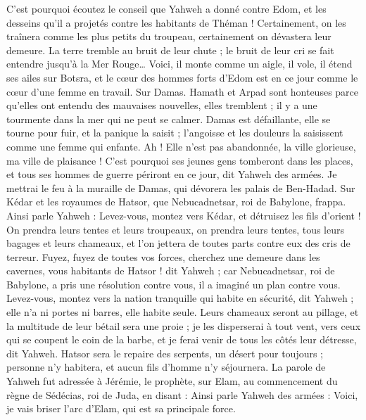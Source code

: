\begin{multicols}{2}
C'est pourquoi écoutez le conseil que Yahweh a donné contre Edom, et les desseins qu'il a projetés contre les habitants de Théman ! Certainement, on les traînera comme les plus petits du troupeau, certainement on dévastera leur demeure.
La terre tremble au bruit de leur chute ; le bruit de leur cri se fait entendre jusqu'à la Mer Rouge…
Voici, il monte comme un aigle, il vole, il étend ses ailes sur Botsra, et le cœur des hommes forts d'Edom est en ce jour comme le cœur d'une femme en travail.
Sur Damas. Hamath et Arpad sont honteuses parce qu'elles ont entendu des mauvaises nouvelles, elles tremblent ; il y a une tourmente dans la mer qui ne peut se calmer.
Damas est défaillante, elle se tourne pour fuir, et la panique la saisit ; l'angoisse et les douleurs la saisissent comme une femme qui enfante.
Ah ! Elle n'est pas abandonnée, la ville glorieuse, ma ville de plaisance !
C'est pourquoi ses jeunes gens tomberont dans les places, et tous ses hommes de guerre périront en ce jour, dit Yahweh des armées.
Je mettrai le feu à la muraille de Damas, qui dévorera les palais de Ben-Hadad.
Sur Kédar et les royaumes de Hatsor, que Nebucadnetsar, roi de Babylone, frappa. Ainsi parle Yahweh : Levez-vous, montez vers Kédar, et détruisez les fils d'orient !
On prendra leurs tentes et leurs troupeaux, on prendra leurs tentes, tous leurs bagages et leurs chameaux, et l'on jettera de toutes parts contre eux des cris de terreur.
Fuyez, fuyez de toutes vos forces, cherchez une demeure dans les cavernes, vous habitants de Hatsor ! dit Yahweh ; car Nebucadnetsar, roi de Babylone, a pris une résolution contre vous, il a imaginé un plan contre vous.
Levez-vous, montez vers la nation tranquille qui habite en sécurité, dit Yahweh ; elle n'a ni portes ni barres, elle habite seule.
Leurs chameaux seront au pillage, et la multitude de leur bétail sera une proie ; je les disperserai à tout vent, vers ceux qui se coupent le coin de la barbe, et je ferai venir de tous les côtés leur détresse, dit Yahweh.
Hatsor sera le repaire des serpents, un désert pour toujours ; personne n'y habitera, et aucun fils d'homme n'y séjournera.
La parole de Yahweh fut adressée à Jérémie, le prophète, sur Elam, au commencement du règne de Sédécias, roi de Juda, en disant :
Ainsi parle Yahweh des armées : Voici, je vais briser l'arc d'Elam, qui est sa principale force.

\end{multicols}
